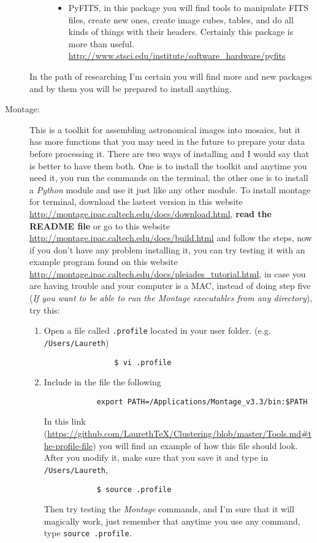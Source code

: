 \documentclass[11pt,fleqn]{book} %
\begin{document}
\begin{description}
\begin{description}
\begin{itemize}
                \item PyFITS, in this package you will find tools to manipulate FITS files, create new ones, create image cubes, tables, and do all kinds of things with their headers. Certainly this package is more than useful. \url{http://www.stsci.edu/institute/software_hardware/pyfits}
            \end{itemize}
    \end{description}
    In the path of researching I'm certain you will find more and new packages and by them you will be prepared to install anything.
    \item[Montage: ]This is a toolkit for assembling astronomical images into mosaics, but it has more functions that you may need in the future to prepare your data before processing it. There are two ways of installing and I would say that is better to have them both. One is to install the toolkit and anytime you need it, you run the commands on the terminal, the other one is to install a \emph{Python} module and use it just like any other module.
    To install montage for terminal, download the lastest version in this website \url{http://montage.ipac.caltech.edu/docs/download.html}, \textbf{read the README file} or go to this website \url{http://montage.ipac.caltech.edu/docs/build.html} and follow the steps, now if you don't have any problem installing it, you can try testing it with an example program found on this website \url{http://montage.ipac.caltech.edu/docs/pleiades_tutorial.html}, in case you are having trouble and your computer is a MAC, instead of doing step five (\emph{If you want to be able to run the Montage executables from any directory}), try this:
    
    \begin{enumerate}
    	\item Open a file called \verb|.profile| located in your user folder. (e.g. \verb|/Users/Laureth|)
        	\begin{verbatim}
            	$ vi .profile
            \end{verbatim}
         \item Include in the file the following
           \begin{verbatim}
           	export PATH=/Applications/Montage_v3.3/bin:$PATH
           \end{verbatim}
           In this link (\url{https://github.com/LaurethTeX/Clustering/blob/master/Tools.md#the-profile-file}) you will find an example of how this file should look. After you modify it, make sure that you save it and type in \verb|/Users/Laureth|,
           \begin{verbatim}
           	$ source .profile
           \end{verbatim}
           Then try testing the \emph{Montage} commands, and I'm sure that it will magically work, just remember that anytime you use any command, type \verb|source .profile|.\\
            

\end{enumerate}
\end{description}
\end{document}
